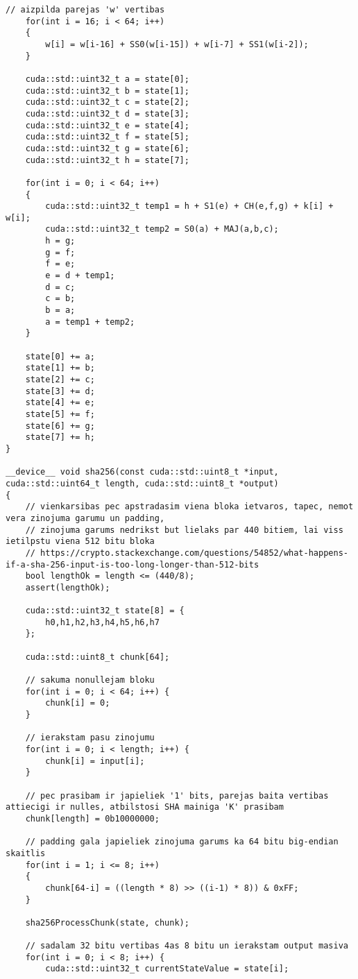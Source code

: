 \documentclass[12pt]{report}%
\theoremstyle{definition}
\begin{document}
\begin{lstlisting}[caption={Paroļu lauzēja implementācija CUDA vidē},
  label=lst:cuda_impl,
  captionpos=t
  ]
    // aizpilda parejas 'w' vertibas
    for(int i = 16; i < 64; i++)
    {
        w[i] = w[i-16] + SS0(w[i-15]) + w[i-7] + SS1(w[i-2]);
    }

    cuda::std::uint32_t a = state[0];
    cuda::std::uint32_t b = state[1];
    cuda::std::uint32_t c = state[2];
    cuda::std::uint32_t d = state[3];
    cuda::std::uint32_t e = state[4];
    cuda::std::uint32_t f = state[5];
    cuda::std::uint32_t g = state[6];
    cuda::std::uint32_t h = state[7];

    for(int i = 0; i < 64; i++)
    {
        cuda::std::uint32_t temp1 = h + S1(e) + CH(e,f,g) + k[i] + w[i];
        cuda::std::uint32_t temp2 = S0(a) + MAJ(a,b,c);
        h = g;
        g = f;
        f = e;
        e = d + temp1;
        d = c;
        c = b;
        b = a;
        a = temp1 + temp2;
    }

    state[0] += a;
    state[1] += b;
    state[2] += c;
    state[3] += d;
    state[4] += e;
    state[5] += f;
    state[6] += g;
    state[7] += h;
}

__device__ void sha256(const cuda::std::uint8_t *input, cuda::std::uint64_t length, cuda::std::uint8_t *output)
{
    // vienkarsibas pec apstradasim viena bloka ietvaros, tapec, nemot vera zinojuma garumu un padding,
    // zinojuma garums nedrikst but lielaks par 440 bitiem, lai viss ietilpstu viena 512 bitu bloka
    // https://crypto.stackexchange.com/questions/54852/what-happens-if-a-sha-256-input-is-too-long-longer-than-512-bits
    bool lengthOk = length <= (440/8);
    assert(lengthOk);

    cuda::std::uint32_t state[8] = {
        h0,h1,h2,h3,h4,h5,h6,h7
    };

    cuda::std::uint8_t chunk[64];

    // sakuma nonullejam bloku
    for(int i = 0; i < 64; i++) {
        chunk[i] = 0;
    }
    
    // ierakstam pasu zinojumu
    for(int i = 0; i < length; i++) {
        chunk[i] = input[i];
    }
    
    // pec prasibam ir japieliek '1' bits, parejas baita vertibas attiecigi ir nulles, atbilstosi SHA mainiga 'K' prasibam
    chunk[length] = 0b10000000;

    // padding gala japieliek zinojuma garums ka 64 bitu big-endian skaitlis
    for(int i = 1; i <= 8; i++)
    {
        chunk[64-i] = ((length * 8) >> ((i-1) * 8)) & 0xFF;
    }

    sha256ProcessChunk(state, chunk);

    // sadalam 32 bitu vertibas 4as 8 bitu un ierakstam output masiva
    for(int i = 0; i < 8; i++) {
        cuda::std::uint32_t currentStateValue = state[i];


\end{lstlisting}
\end{document}
